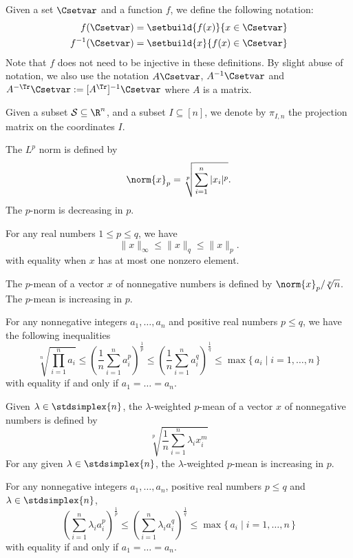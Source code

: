 \documentclass[11pt,twoside,a4paper,openright]{uclouvain-thesis}
\begin{document}
Given a set $\Csetvar$ and a function $f$, we define the following notation:
\begin{align}
  \notag
  f(\Csetvar) & = \setbuild{f(x)}{x \in \Csetvar}\\
  \label{eq:invf}
  f^{-1}(\Csetvar) & = \setbuild{x}{f(x) \in \Csetvar}
\end{align}
Note that $f$ does not need to be injective in these definitions.
By slight abuse of notation, we also use the notation $A\Csetvar$,
$A^{-1}\Csetvar$ and $A^{-\Tr}\Csetvar := [A^\Tr]^{-1}\Csetvar$ where $A$ is a matrix.

Given a subset $\mathcal{S} \subseteq \R^n$, and a subset $I \subseteq [n]$,
we denote by $\pi_{I,n}$ the projection matrix on the coordinates $I$.

The $L^p$ norm is defined by
\[ \norm{x}_{p} = \sqrt[p]{\sum_{i=1}^n |x_i|^{p}}. \]
The $p$-norm is decreasing in $p$.
\begin{myprop}
  \label{prop:pnorm}
  For any real numbers $1 \le p \leq q$, we have
  \[
    \|x\|_\infty \leq \|x\|_q \leq \|x\|_p.
  \]
  with equality when $x$ has at most one nonzero element.
\end{myprop}

The $p$-mean of a vector $x$ of nonnegative numbers is defined by $\norm{x}_p / \sqrt[p]{n}$.
The $p$-mean is increasing in $p$.
\begin{myprop}
  \label{prop:pmean}
  For any nonnegative integers $a_1, \ldots, a_n$ and positive
  real numbers $p \leq q$, we have the following
  inequalities
  \[
    \sqrt[n]{\prod_{i=1}^n a_i}
    \leq
    \left(\frac{1}{n}\sum_{i=1}^n a_i^p\right)^{\frac{1}{p}}
    \leq
    \left(\frac{1}{n}\sum_{i=1}^n a_i^q\right)^{\frac{1}{q}}
    \leq \max\{\, a_i \mid i = 1, \ldots, n\,\}
  \]
  with equality if and only if $a_1 = \ldots = a_n$.
\end{myprop}

Given $\lambda \in \stdsimplex{n}$, the $\lambda$-weighted $p$-mean of
a vector $x$ of nonnegative numbers is defined by
\[ \sqrt[p]{\frac{1}{n} \sum_{i=1}^n \lambda_i x_i^m} \]
For any given $\lambda \in \stdsimplex{n}$, the $\lambda$-weighted $p$-mean is increasing in $p$.
\begin{myprop}
  \label{prop:wpmean}
  For any nonnegative integers $a_1, \ldots, a_n$, positive
  real numbers $p \leq q$ and $\lambda \in \stdsimplex{n}$,
  \[
    \left(\sum_{i=1}^n \lambda_i a_i^p\right)^{\frac{1}{p}}
    \leq
    \left(\sum_{i=1}^n \lambda_i a_i^q\right)^{\frac{1}{q}}
    \leq \max\{\, a_i \mid i = 1, \ldots, n\,\}
  \]
  with equality if and only if $a_1 = \ldots = a_n$.
\end{myprop}
\end{document}
